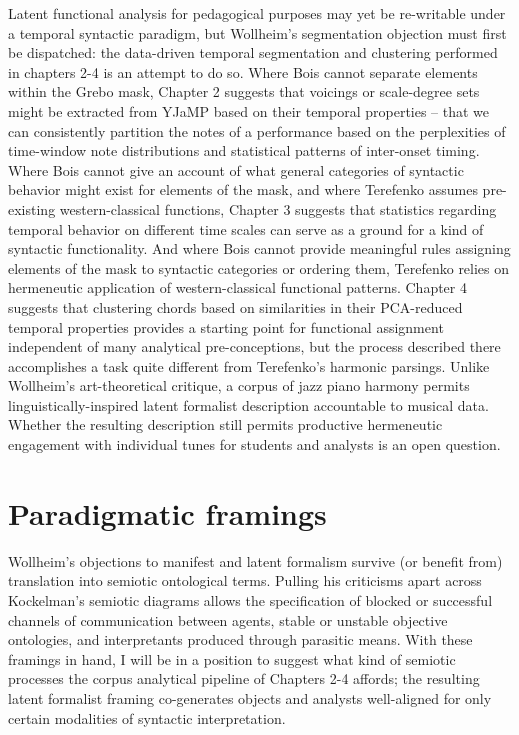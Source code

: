 Latent functional analysis for pedagogical purposes may yet be re-writable under a temporal syntactic paradigm, but Wollheim's segmentation objection must first be dispatched: the data-driven temporal segmentation and clustering performed in chapters 2-4 is an attempt to do so.  Where Bois cannot separate elements within the Grebo mask, Chapter 2 suggests that voicings or scale-degree sets might be extracted from YJaMP based on their temporal properties -- that we can consistently partition the notes of a performance based on the perplexities of time-window note distributions and statistical patterns of inter-onset timing.  Where Bois cannot give an account of what general categories of syntactic behavior might exist for elements of the mask, and where Terefenko assumes pre-existing western-classical functions, Chapter 3 suggests that statistics regarding temporal behavior on different time scales can serve as a ground for a kind of syntactic functionality.  And where Bois cannot provide meaningful rules assigning elements of the mask to syntactic categories or ordering them, Terefenko relies on hermeneutic application of western-classical functional patterns.  Chapter 4 suggests that clustering chords based on similarities in their PCA-reduced temporal properties provides a starting point for functional assignment independent of many analytical pre-conceptions, but the process described there accomplishes a task quite different from  Terefenko's harmonic parsings.  Unlike Wollheim's art-theoretical critique, a corpus of jazz piano harmony permits linguistically-inspired latent formalist description accountable to musical data.  Whether the resulting description still permits productive hermeneutic engagement with individual tunes for students and analysts is an open question.

\section{Paradigmatic framings}
Wollheim's objections to manifest and latent formalism survive (or benefit from) translation into semiotic ontological terms. Pulling his criticisms apart across Kockelman's semiotic diagrams allows the specification of blocked or successful channels of communication between agents, stable or unstable objective ontologies, and interpretants produced through parasitic means.  With these framings in hand, I will be in a position to suggest what kind of semiotic processes the corpus analytical pipeline of Chapters 2-4 affords; the resulting latent formalist framing co-generates objects and analysts well-aligned for only certain modalities of syntactic interpretation.

